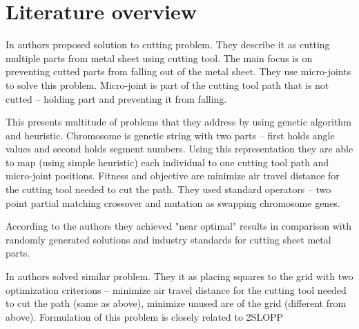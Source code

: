\section{Literature overview}

In \cite{kandasamyEffectiveLocationMicro2020} authors proposed solution to cutting problem.
They describe it as cutting multiple parts from metal sheet using cutting tool.
The main focus is on preventing cutted parts from falling out of the metal sheet.
They use micro-joints to solve this problem. Micro-joint is part of the cutting tool
path that is not cutted – holding part and preventing it from falling.

This presents multitude of problems that they address by using genetic algorithm
and heuristic. Chromosome is genetic string with two parts – first holds
angle values and second holds segment numbers. Using this representation they are able
to map (using simple heuristic) each individual to one cutting tool path and micro-joint positions.
Fitness and objective are minimize air travel distance for the cutting tool needed to cut the
path. They used standard operators – two point partial matching crossover and mutation
as swapping chromosome genes.

According to the authors they achieved "near optimal" results in comparison with randomly
generated solutions and industry standards for cutting sheet metal parts.

In \cite{vijayanandHeuristicGeneticApproach2015} authors solved similar problem. They it
as placing squares to the grid with two optimization criterions – minimize air travel distance
for the cutting tool needed to cut the path (same as above), minimize unused are of the grid (different from above).
Formulation of this problem is closely related to 2SLOPP\footnotemark


